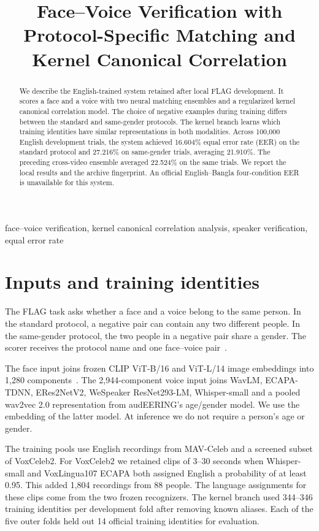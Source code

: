 \documentclass[10pt,letterpaper]{article}
\title{Face--Voice Verification with Protocol-Specific Matching and Kernel Canonical Correlation}
\begin{document}
\maketitle

\begin{abstract}
We describe the English-trained system retained after local FLAG development.
It scores a face and a voice with two neural matching ensembles and a
regularized kernel canonical correlation model. The choice of negative
examples during training differs between the standard and same-gender
protocols. The kernel branch learns which training identities have similar
representations in both modalities. Across 100,000 English development
trials, the system achieved 16.604\% equal error rate (EER) on the standard
protocol and 27.216\% on same-gender trials, averaging 21.910\%.
The preceding cross-video ensemble averaged 22.524\% on the same trials.
We report the local results and the archive fingerprint. An official
English--Bangla four-condition EER is unavailable for this system.
\end{abstract}
\begin{keywords}
face--voice verification, kernel canonical correlation analysis,
speaker verification, equal error rate
\end{keywords}

\section{Inputs and training identities}
The FLAG task asks whether a face and a voice belong to the same person.
In the standard protocol, a negative pair can contain any two different
people. In the same-gender protocol, the two people in a negative pair
share a gender. The scorer receives the protocol name and one face--voice
pair~\cite{flag}.

The face input joins frozen CLIP ViT-B/16 and ViT-L/14 image embeddings
into 1,280 components~\cite{clip}. The 2,944-component voice input joins
WavLM, ECAPA-TDNN, ERes2NetV2, WeSpeaker ResNet293-LM, Whisper-small
and a pooled wav2vec 2.0 representation from audEERING's age/gender model.
We use the embedding of the latter model. At inference we do not require
a person's age or gender.

The training pools use English recordings from MAV-Celeb and a screened
subset of VoxCeleb2. For VoxCeleb2 we retained clips of 3--30 seconds
when Whisper-small and VoxLingua107 ECAPA both assigned English a
probability of at least 0.95. This added 1,804 recordings from 88 people.
The language assignments for these clips come from the two frozen
recognizers. The kernel branch used 344--346 training identities per
development fold after removing known aliases. Each of the five outer
folds held out 14 official training identities for evaluation.
\end{document}
